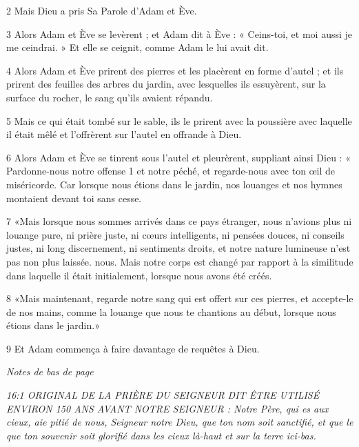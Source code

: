 \par 2 Mais Dieu a pris Sa Parole d'Adam et Ève.

\par 3 Alors Adam et Ève se levèrent ; et Adam dit à Ève : « Ceins-toi, et moi aussi je me ceindrai. » Et elle se ceignit, comme Adam le lui avait dit.

\par 4 Alors Adam et Ève prirent des pierres et les placèrent en forme d'autel ; et ils prirent des feuilles des arbres du jardin, avec lesquelles ils essuyèrent, sur la surface du rocher, le sang qu'ils avaient répandu.

\par 5 Mais ce qui était tombé sur le sable, ils le prirent avec la poussière avec laquelle il était mêlé et l'offrèrent sur l'autel en offrande à Dieu.

\par 6 Alors Adam et Ève se tinrent sous l'autel et pleurèrent, suppliant ainsi Dieu : « Pardonne-nous notre offense 1 et notre péché, et regarde-nous avec ton œil de miséricorde. Car lorsque nous étions dans le jardin, nos louanges et nos hymnes montaient devant toi sans cesse.

\par 7 «Mais lorsque nous sommes arrivés dans ce pays étranger, nous n'avions plus ni louange pure, ni prière juste, ni cœurs intelligents, ni pensées douces, ni conseils justes, ni long discernement, ni sentiments droits, et notre nature lumineuse n'est pas non plus laissée. nous. Mais notre corps est changé par rapport à la similitude dans laquelle il était initialement, lorsque nous avons été créés.

\par 8 «Mais maintenant, regarde notre sang qui est offert sur ces pierres, et accepte-le de nos mains, comme la louange que nous te chantions au début, lorsque nous étions dans le jardin.»

\par 9 Et Adam commença à faire davantage de requêtes à Dieu.

\par \textit{Notes de bas de page}

\par \textit{16:1 ORIGINAL DE LA PRIÈRE DU SEIGNEUR DIT ÊTRE UTILISÉ ENVIRON 150 ANS AVANT NOTRE SEIGNEUR : Notre Père, qui es aux cieux, aie pitié de nous, Seigneur notre Dieu, que ton nom soit sanctifié, et que le que ton souvenir soit glorifié dans les cieux là-haut et sur la terre ici-bas.}

